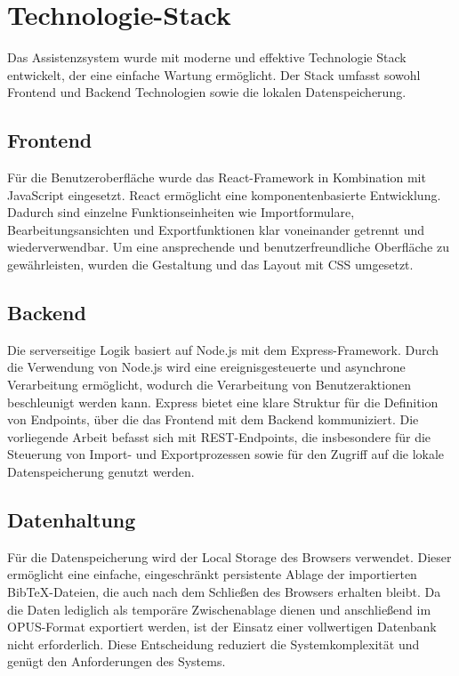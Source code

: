 \section{Technologie-Stack}
Das Assistenzsystem wurde mit moderne und effektive Technologie Stack
entwickelt, der eine einfache Wartung ermöglicht. Der Stack umfasst sowohl
Frontend und Backend Technologien sowie die lokalen Datenspeicherung.

\subsection{Frontend}
Für die Benutzeroberfläche wurde das React-Framework in Kombination mit JavaScript eingesetzt. 
React ermöglicht eine komponentenbasierte Entwicklung. Dadurch sind einzelne Funktionseinheiten 
wie Importformulare, Bearbeitungsansichten und Exportfunktionen klar voneinander getrennt und 
wiederverwendbar. Um eine ansprechende und benutzerfreundliche Oberfläche zu gewährleisten, 
wurden die Gestaltung und das Layout mit CSS umgesetzt.

\subsection{Backend}
Die serverseitige Logik basiert auf Node.js mit dem Express-Framework. Durch die Verwendung von 
Node.js wird eine ereignisgesteuerte und asynchrone Verarbeitung ermöglicht, wodurch die Verarbeitung 
von Benutzeraktionen beschleunigt werden kann. Express bietet eine klare Struktur für die Definition 
von Endpoints, über die das Frontend mit dem Backend kommuniziert. Die vorliegende Arbeit befasst 
sich mit REST-Endpoints, die insbesondere für die Steuerung von Import- und Exportprozessen sowie für 
den Zugriff auf die lokale Datenspeicherung genutzt werden.

\subsection{Datenhaltung}
Für die Datenspeicherung wird der Local Storage des Browsers verwendet. Dieser ermöglicht eine einfache, 
eingeschränkt persistente Ablage der importierten BibTeX-Dateien, die auch nach dem Schließen des Browsers 
erhalten bleibt. Da die Daten lediglich als temporäre Zwischenablage dienen und anschließend im OPUS-Format 
exportiert werden, ist der Einsatz einer vollwertigen Datenbank nicht erforderlich. Diese Entscheidung 
reduziert die Systemkomplexität und genügt den Anforderungen des Systems.


